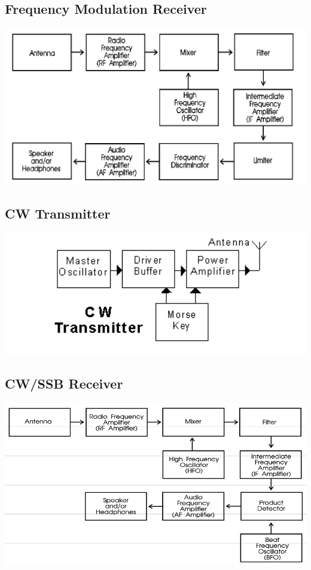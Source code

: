 \documentclass[letterpaper,12pt]{scrartcl}
\begin{document}
\subsection{Frequency Modulation Receiver}

\includegraphics[width=150mm]{fm-receiver.png}

\subsection{CW Transmitter}

\includegraphics[width=150mm]{cw-transmitter.png}

\subsection{CW/SSB Receiver}

\includegraphics[width=150mm]{cw-ssb-receiver.png}
\end{document}
